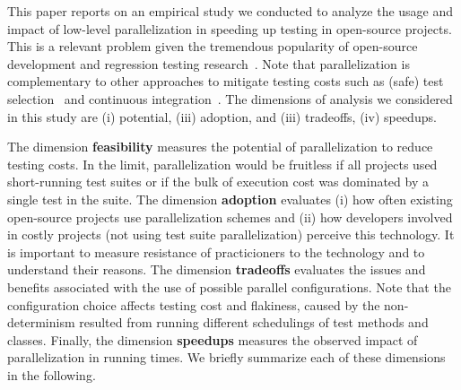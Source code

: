 

This paper reports on an empirical study we conducted to analyze the
usage and impact of low-level parallelization in speeding up testing
in open-source projects.  This is a relevant problem given the
tremendous popularity of open-source development and regression
testing research~\cite{yoo-harman-stvr2012}.  Note that
parallelization is complementary to other approaches to mitigate
testing costs such as (safe) test
selection~\cite{Rothermel:1997:SER:248233.248262} and continuous
integration~\cite{Saff:2003:RWD:951952.952340}.  The dimensions of
analysis we considered in this study are (i) potential, (iii)
adoption, and (iii) tradeoffs, (iv) speedups.


The dimension \textbf{feasibility} measures the potential of
parallelization to reduce testing costs.  In the limit,
parallelization would be fruitless if all projects used short-running
test suites or if the bulk of execution cost was dominated by a single
test in the suite.  The dimension \textbf{adoption} evaluates (i) how
often existing open-source projects use parallelization schemes and
(ii) how developers involved in costly projects (not using test suite
parallelization) perceive this technology.  It is important to measure
resistance of practicioners to the technology and to understand their
reasons.  The dimension \textbf{tradeoffs} evaluates the issues and
benefits associated with the use of
possible parallel configurations.  Note that the configuration choice
affects testing cost and flakiness, caused by the non-determinism
resulted from running different schedulings of test methods and
classes.  Finally, the dimension \textbf{speedups} measures the
observed impact of parallelization in running times.  We briefly summarize
each of these dimensions in the following.

